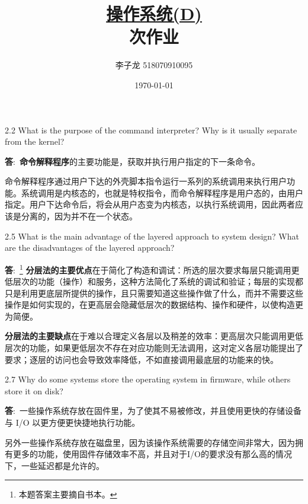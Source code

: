 \documentclass[12pt,a4paper]{article}
\newenvironment{problems}{\begin{list}{}{\renewcommand{\makelabel}[1]{\textbf{##1}\hfil}}}{\end{list}}
\providecommand{\ans}{\textbf{答}:~}
\begin{document}
\title{\normalsize \underline{操作系统(D)}\\ 次作业}
\author{李子龙 518070910095}
\date{\today}
\maketitle

\begin{problems}
    \item[2.2] What is the purpose of the command interpreter? Why is it usually
    separate from the kernel?

    \ans \textbf{命令解释程序}的主要功能是，获取并执行用户指定的下一条命令。
    
    命令解释程序通过用户下达的外壳脚本指令运行一系列的系统调用来执行用户功能。系统调用是内核态的，也就是特权指令，而命令解释程序是用户态的，由用户指定。用户下达命令后，将会从用户态变为内核态，以执行系统调用，因此两者应该是分离的，因为并不在一个状态。

    \item[2.5] What is the main advantage of the layered approach to system design?
    What are the disadvantages of the layered approach?

    \ans\footnote{本题答案主要摘自书本。} \textbf{分层法的主要优点}在于简化了构造和调试：所选的层次要求每层只能调用更低层次的功能（操作）和服务，这种方法简化了系统的调试和验证；每层的实现都只是利用更底层所提供的操作，且只需要知道这些操作做了什么，而并不需要这些操作是如何实现的，在更高层会隐藏低层次的数据结构、操作和硬件，以使构造更为简便。

    \textbf{分层法的主要缺点}在于难以合理定义各层以及稍差的效率：更高层次只能调用更低层次的功能，如果更低层次不存在对应功能则无法调用，这对定义各层功能提出了要求；逐层的访问也会导致效率降低，不如直接调用最底层的功能来的快。
    \item[2.7] Why do some systems store the operating system in firmware, while
    others store it on disk?

    \ans 一些操作系统存放在固件里，为了使其不易被修改，并且使用更快的存储设备与 I/O 以更方便更快捷地执行功能。
    
    另外一些操作系统存放在磁盘里，因为该操作系统需要的存储空间非常大，因为拥有更多的功能，使用固件存储效率不高，并且对于I/O的要求没有那么高的情况下，一些延迟都是允许的。
\end{problems}
\end{document}
